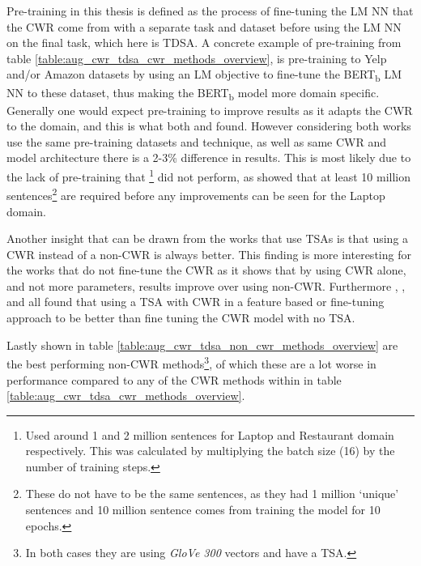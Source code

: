 Pre-training in this thesis is defined as the process of fine-tuning the LM NN that the CWR come from with a separate task and dataset before using the LM NN on the final task, which here is TDSA. A concrete example of pre-training from table \ref{table:aug_cwr_tdsa_cwr_methods_overview}, is pre-training to Yelp and/or Amazon datasets by using an LM objective to fine-tune the BERT\textsubscript{b} LM NN to these dataset, thus making the BERT\textsubscript{b} model more domain specific. Generally one would expect pre-training to improve results as it adapts the CWR to the domain, and this is what both \citet{cwr_tdsa_models_rietzler2019adapt} and \citet{cwr_tdsa_models_xu-etal-2019-bert} found. However considering both works use the same pre-training datasets and technique, as well as same CWR and model architecture there is a 2-3\% difference in results. This is most likely due to the lack of pre-training that \citet{cwr_tdsa_models_xu-etal-2019-bert}\footnote{Used around 1 and 2 million sentences for Laptop and Restaurant domain respectively. This was calculated by multiplying the batch size (16) by the number of training steps.} did not perform, as \citet{cwr_tdsa_models_rietzler2019adapt} showed that at least 10 million sentences\footnote{These do not have to be the same sentences, as they had 1 million `unique' sentences and 10 million sentence comes from training the model for 10 epochs.} are required before any improvements can be seen for the Laptop domain.

Another insight that can be drawn from the works that use TSAs \citep{cwr_tdsa_models_zeng2019lcf,cwr_tdsa_models_zhaoa2019modeling,cwr_tdsa_models_song2019attentional,cwr_tdsa_models_huang2019syntax, methods_jiang-etal-2019-challenge} is that using a CWR instead of a non-CWR is always better. This finding is more interesting for the works that do not fine-tune the CWR \citep{cwr_tdsa_models_zhaoa2019modeling, cwr_tdsa_models_huang2019syntax} as it shows that by using CWR alone, and not more parameters, results improve over using non-CWR. Furthermore \citet{cwr_tdsa_models_song2019attentional}, \citet{methods_jiang-etal-2019-challenge}, and \citet{cwr_tdsa_models_huang2019syntax} all found that using a TSA with CWR in a feature based or fine-tuning approach to be better than fine tuning the CWR model with no TSA.

Lastly shown in table \ref{table:aug_cwr_tdsa_non_cwr_methods_overview} are the best performing non-CWR methods\footnote{In both cases they are using \textit{GloVe 300} vectors and have a TSA.}, of which these are a lot worse in performance compared to any of the CWR methods within in table \ref{table:aug_cwr_tdsa_cwr_methods_overview}.

